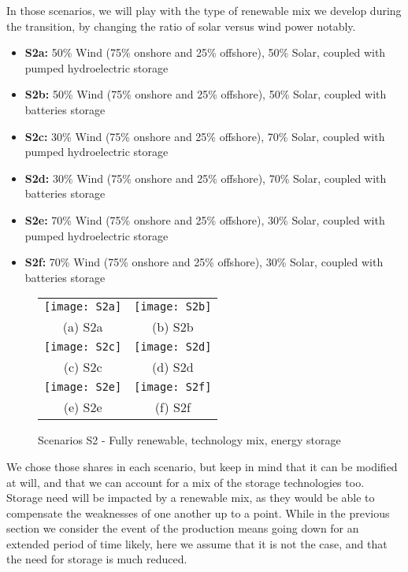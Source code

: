 In those scenarios, we will play with the type of renewable mix we develop during the transition, by changing the ratio of solar versus wind power notably.


\begin{kaobox}[frametitle=S2 scenarios]
\begin{itemize}
	\item \textbf{S2a:} 50\% Wind (75\% onshore and 25\% offshore), 50\% Solar, coupled with pumped hydroelectric storage
	\item \textbf{S2b:} 50\% Wind (75\% onshore and 25\% offshore), 50\% Solar, coupled with batteries storage
	\item \textbf{S2c:} 30\% Wind (75\% onshore and 25\% offshore), 70\% Solar, coupled with pumped hydroelectric storage
	\item \textbf{S2d:} 30\% Wind (75\% onshore and 25\% offshore), 70\% Solar, coupled with batteries storage
	\item \textbf{S2e:} 70\% Wind (75\% onshore and 25\% offshore), 30\% Solar, coupled with pumped hydroelectric storage
	\item \textbf{S2f:} 70\% Wind (75\% onshore and 25\% offshore), 30\% Solar, coupled with batteries storage
\end{itemize}
\end{kaobox}


\begin{figure*}
\begin{tabular}{cc}
  \texttt{[image: S2a]} &   \texttt{[image: S2b]} \\
(a) S2a & (b) S2b \\[6pt]
 \texttt{[image: S2c]} &   \texttt{[image: S2d]} \\
(c) S2c & (d) S2d \\[6pt]
 \texttt{[image: S2e]} &   \texttt{[image: S2f]} \\
(e) S2e & (f) S2f \\[6pt]
\end{tabular}
\caption{Scenarios S2 - Fully renewable, technology mix, energy storage}
\end{figure*}

We chose those shares in each scenario, but keep in mind that it can be modified at will, and that we can account for a mix of the storage technologies too. Storage need will be impacted by a renewable mix, as they would be able to compensate the weaknesses of one another up to a point. While in the previous section we consider the event of the production means going down for an extended period of time likely, here we assume that it is not the case, and that the need for storage is much reduced.


